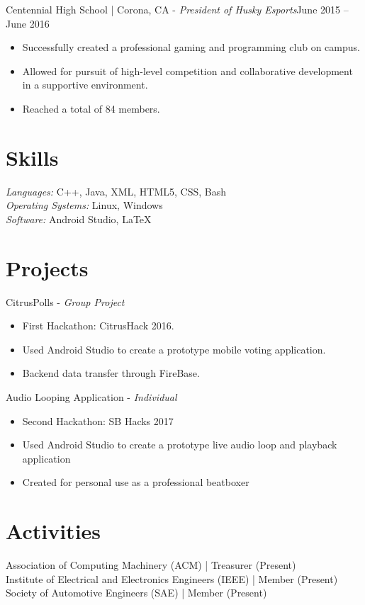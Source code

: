 \documentclass[letter]{res}
\begin{document}
\begin{resume}
Centennial High School | Corona, CA \newline - {\sl President of Husky Esports}\hfill  June 2015 – June 2016\\
 \vspace{-2mm}
 \begin{itemize}
 \item Successfully created a professional gaming and programming club on campus.
 \item Allowed for pursuit of high-level competition and collaborative development in a supportive environment.
 \item Reached a total of 84 members.
 \end{itemize}
  \vspace{-2mm}
  
\section{Skills}
{\sl Languages:}  C++, Java, XML, HTML5, CSS, Bash \\
{\sl Operating Systems:} Linux, Windows \\ 
{\sl Software:} Android Studio, \LaTeX \\ 
 \vspace{-2mm}

\section{Projects}
CitrusPolls \newline - {\sl Group Project} \\
\begin{itemize}
  \vspace{-2mm}
  \item First Hackathon: CitrusHack 2016.
  \item Used Android Studio to create a prototype mobile voting application.
  \item Backend data transfer through FireBase.
\end{itemize}

Audio Looping Application \newline - {\sl Individual}
\begin{itemize}
  \vspace{2mm}
  \item Second Hackathon: SB Hacks 2017
  \item Used Android Studio to create a prototype live audio loop and playback application 
  \item Created for personal use as a professional beatboxer
\end{itemize}
  

\section{Activities} 
 Association of Computing Machinery (ACM) | Treasurer (Present) \\
 Institute of Electrical and Electronics Engineers (IEEE) | Member (Present) \\
 Society of Automotive Engineers (SAE) | Member (Present) \\

\end{resume}
\end{document}

